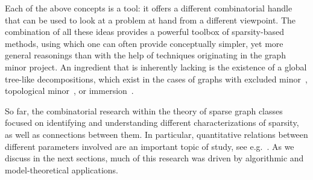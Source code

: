 Each of the above concepts is a tool: it offers a different combinatorial handle that can be used to look at a problem at hand from a different viewpoint.
The combination of all these ideas provides a powerful toolbox of sparsity-based methods, using which one can often provide conceptually simpler, yet more general reasonings than 
with the help of techniques originating in the graph minor project. 
An ingredient that is inherently lacking is the existence of a global tree-like decompositions,
which exist in the cases of graphs with excluded minor~\cite{GM16}, topological minor~\cite{GroheM15}, or immersion~\cite{Wollan15}.

So far, the combinatorial research within the theory of sparse graph classes focused on identifying and understanding different characterizations of sparsity, as well as connections between them.
In particular, quantitative relations between different parameters involved are an important topic of study, 
see e.g.~\cite{GroheKRSS15,siebertz2016polynomial,kun2018lincolor,pilipczuk2019centered,pilipczuk2018number,HeuvelMQRS17}.
As we discuss in the next sections, much of this research was driven by algorithmic and model-theoretical applications.


